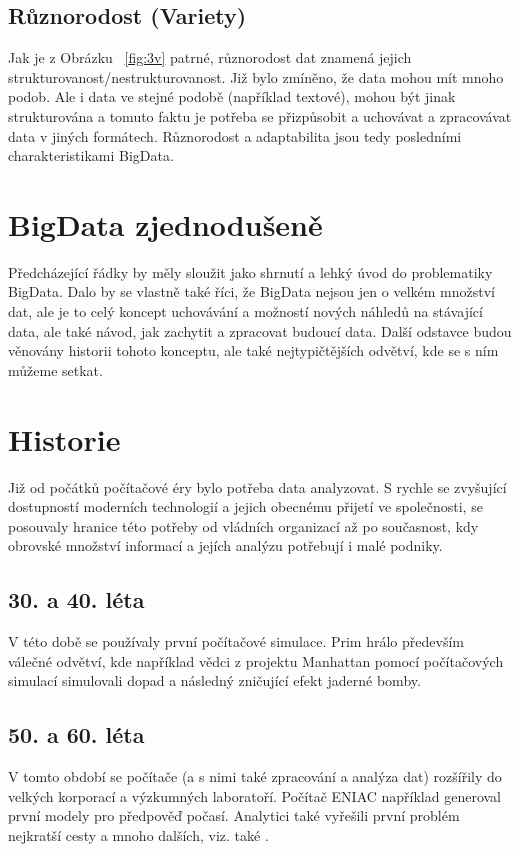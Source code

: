 \subsection{Různorodost (Variety)}
Jak je z Obrázku ~\ref{fig:3v} patrné, různorodost dat znamená jejich strukturovanost/nestrukturovanost. Již bylo zmíněno, že data mohou mít mnoho podob. Ale i data ve stejné podobě (například textové), mohou být jinak strukturována a tomuto faktu je potřeba se přizpůsobit a uchovávat a zpracovávat data v jiných formátech. %
Různorodost a adaptabilita jsou tedy posledními charakteristikami BigData.

\section{BigData zjednodušeně}
Předcházející řádky by měly sloužit jako shrnutí a lehký úvod do problematiky BigData. Dalo by se vlastně také říci, že BigData nejsou jen o velkém množství dat, ale je to celý koncept uchovávání a možností nových náhledů na stávající data, ale také návod, jak zachytit a zpracovat budoucí data. Další odstavce budou věnovány historii tohoto konceptu, ale také nejtypičtějších odvětví, kde se s ním můžeme setkat. 

\section{Historie}

Již od počátků počítačové éry bylo potřeba data analyzovat. \cite{history} S rychle se zvyšující dostupností moderních technologií a jejich obecnému přijetí ve společnosti, se posouvaly hranice této potřeby od vládních organizací až po současnost, kdy obrovské množství informací a jejích analýzu potřebují i malé podniky.

\subsection{30. a 40. léta}
V této době se používaly první počítačové simulace. Prim hrálo především válečné odvětví, kde například vědci z projektu Manhattan pomocí počítačových simulací simulovali dopad a následný zničující efekt jaderné bomby.

\subsection{50. a 60. léta}
V tomto období se počítače (a s nimi také zpracování a analýza dat) rozšířily do velkých korporací a výzkumných laboratoří. Počítač ENIAC například generoval první modely pro předpověď počasí. Analytici také vyřešili první problém nejkratší cesty a mnoho dalších, viz. také \cite{history}.

